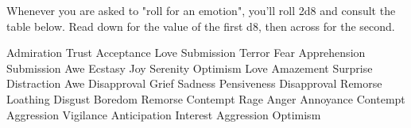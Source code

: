 Whenever you are asked to "roll for an emotion", you'll roll 2d8 and consult the table below.
Read down for the value of the first d8, then across for the second.

{
\HL
{}
\NR
\HL
{}
\NC Admiration
\NC Trust
\NC Acceptance
\NC Love
\NC Submission
\NR
{}
\NC Terror
\NC Fear
\NC Apprehension
\NC Submission
\NC Awe
\NR
{}
\NC Ecstasy
\NC Joy
\NC Serenity
\NC Optimism
\NC Love
\NR
{}
\NC Amazement
\NC Surprise
\NC Distraction
\NC Awe
\NC Disapproval
\NR
{}
\NC Grief
\NC Sadness
\NC Pensiveness
\NC Disapproval
\NC Remorse
\NR
{}
\NC Loathing
\NC Disgust
\NC Boredom
\NC Remorse
\NC Contempt
\NR
{}
\NC Rage
\NC Anger
\NC Annoyance
\NC Contempt
\NC Aggression
\NR
{}
\NC Vigilance
\NC Anticipation
\NC Interest
\NC Aggression
\NC Optimism
\NR
\HL
\stoptabulate}